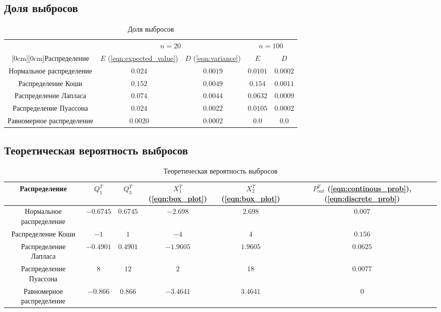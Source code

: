 \documentclass[12pt,a4paper]{article}
\begin{document}
	\subsection{Доля выбросов}
	\begin{table}[H]
		\begin{center}
			\begin{tabular}{|c|c|c|c|c|}
				\hline
				& \multicolumn{2}{c|}{$n=20$} & \multicolumn{2}{c|}{$n=100$}\\
				\cline{2-5}
				\raisebox{1.5ex}[0cm][0cm]{Распределение}
				& $E$ (\ref{eqn:expected_value}) & $D$ (\ref{eqn:variance}) & $E$ & $D$\\
				\hline
				Нормальное распределение & $0.024$ & $0.0019$ & $0.0101$ & $0.0002$ \\
				\hline
				Распределение Коши & $0.152$ & $0.0049$ & $0.154$ & $0.0011$\\
				\hline
				Распределение Лапласа & $0.074$ & $0.0044$ & $0.0632$ & $0.0009$\\
				\hline
				Распределение Пуассона & $0.024$ & $0.0022$ & $0.0105$ & $0.0002$\\
				\hline
				Равномерное распределение & $0.0020$ & $0.0002$ & $0.0$ & $0.0$\\
				\hline
			\end{tabular}
		\end{center}
		\caption{Доля выбросов}
	\end{table}

	\subsection{Теоретическая вероятность выбросов}
		\begin{table}[H]
			\begin{center}
				\begin{tabular}{|c|c|c|c|c|c|}
					\hline
					Распределение & $Q^T_1$ & $Q^T_3$ & $X^T_1$ (\ref{eqn:box_plot}) & $X^T_2$ (\ref{eqn:box_plot}) & $P^T_{out}$ (\ref{eqn:continous_prob}), (\ref{eqn:discrete_prob})\\
					\hline
					Нормальное распределение & $-0.6745$ & $0.6745$ & $-2.698$ & $2.698$ & $0.007$\\
					\hline
					Распределение Коши & $-1$ & $1$ & $-4$ & $4$ & $0.156$\\
					\hline
					Распределение Лапласа & $-0.4901$ & $0.4901$ & $-1.9605$ & $1.9605$ & $0.0625$\\
					\hline
					Распределение Пуассона & $8$ & $12$ & $2$ & $18$ & $0.0077$\\
					\hline
					Равномерное распределение & $-0.866$ & $0.866$ & $-3.4641$ & $3.4641$ & $0$\\
					\hline
				\end{tabular}
			\end{center}
			\caption{Теоретическая вероятность выбросов}
		\end{table}
	
\end{document}
